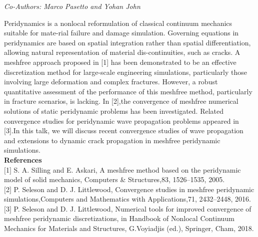 \begin{center}
\textit{Co-Authors: Marco Pasetto and Yohan John}
\end{center} 
Peridynamics is a nonlocal reformulation of classical continuum mechanics suitable for mate-rial failure and damage simulation. Governing equations in peridynamics are based on spatial integration rather than spatial differentiation, allowing natural representation of material dis-continuities, such as cracks. A meshfree approach proposed in [1] has been demonstrated to be an effective discretization method for large-scale engineering simulations, particularly those involving large deformation and complex fractures. However, a robust quantitative assessment of the performance of this meshfree method, particularly in fracture scenarios, is lacking. In [2],the convergence of meshfree numerical solutions of static peridynamic problems has been investigated. Related convergence studies for peridynamic wave propagation problems appeared in [3].In this talk, we will discuss recent convergence studies of wave propagation and extensions to dynamic crack propagation in meshfree peridynamic simulations.\\

\noindent\textbf{References}\\
$[$1$]$ S. A. Silling and E. Askari, A meshfree method based on the peridynamic model of solid mechanics, Computers \& Structures,83, 1526–1535, 2005.\\\newline
$[$2$]$ P. Seleson and D. J. Littlewood, Convergence studies in meshfree peridynamic simulations,Computers and Mathematics with Applications,71, 2432–2448, 2016.\\\newline
$[$3$]$ P. Seleson and D. J. Littlewood, Numerical tools for improved convergence of meshfree peridynamic discretizations, in Handbook of Nonlocal Continuum Mechanics for Materials and Structures, G.Voyiadjis (ed.), Springer, Cham, 2018.
